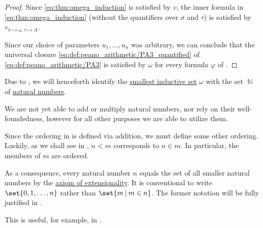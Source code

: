 \begin{proof}
  Since \eqref{eq:thm:omega_induction} is satisfied by \( v \), the inner formula in \eqref{eq:thm:omega_induction} (without the quantifiers over \( \sigma \) and \( \tau \)) is satisfied by \( v_{\sigma \mapsto \omega, \tau \mapsto A} \).

  Since our choice of parameters \( u_1, \ldots, u_n \) was arbitrary, we can conclude that the universal closure \eqref{eq:def:peano_arithmetic/PA3_quantified} of \eqref{eq:def:peano_arithmetic/PA3} is satisfied by \( \omega \) for every formula \( \varphi \) of .
\end{proof}

\begin{remark}\label{rem:set_theory_natural_numbers_without_operations}
  Due to , we will henceforth identify the \hyperref[thm:smallest_inductive_set_existence]{smallest inductive set} \( \omega \) with the set \( \BbbN \) of \hyperref[def:natural_numbers]{natural numbers}.

  We are not yet able to add or multiply natural numbers, nor rely on their well-foundedness, however for all other purposes we are able to utilize them.

  Since the ordering in  is defined via addition, we must define some other ordering. Luckily, as we shall see in , \( n < m \) corresponds to \( n \in m \). In particular, the members of \( m \) are ordered.

  As a consequence, every natural number \( n \) equals the set of all smaller natural numbers by the \hyperref[def:naive_set_theory/extensionality]{axiom of extensionality}. It is conventional to write \( \set{ 0, 1, \ldots, n } \) rather than \( \set{ m \given m \in n } \). The former notation will be fully justified in .

  This is useful, for example, in .
\end{remark}
